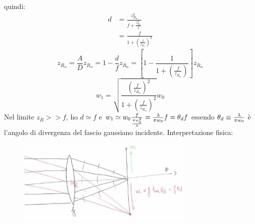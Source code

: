 quindi:
\begin{align*}
d &= \frac{z_{R_\alpha}^2}{f + \frac{z_{R_\alpha}^2}{f}}\\
&= \frac{f}{1 + \left(\frac{f}{z_{R_\alpha}}\right)^2}
\end{align*}
\begin{equation*}
z_{R_\alpha} = \frac{A}{D}z_{R_\alpha} = 1 - \frac{d}{f} z_{R_\alpha} = \left[ 1 - \frac{1}{1 + \left( \frac{f}{z_{R_\alpha}}\right)}\right] z_{R_\alpha}
\end{equation*}
\begin{equation*}
w_1 = \sqrt{\frac{\left(\frac{f}{z_{R_\alpha}}\right)^2}{1 + \left( \frac{f}{z_{R_\alpha}}\right)^2}} w_0
\end{equation*}
Nel limite $z_R >> f$, ho $d \simeq f$ e $w_1 \simeq w_0 \frac{f}{\frac{\pi w_0^2}{\lambda}} = \frac{\lambda}{\pi w_0}f = \theta_d f$ essendo $\theta_d \equiv \frac{\lambda}{\pi w_0}$ è l'angolo di divergenza del fascio gaussiano incidente.
Interpretazione fisica:
\begin{figure}[H]
\centering
\includegraphics[height=4cm]{images/4}
\end{figure}

